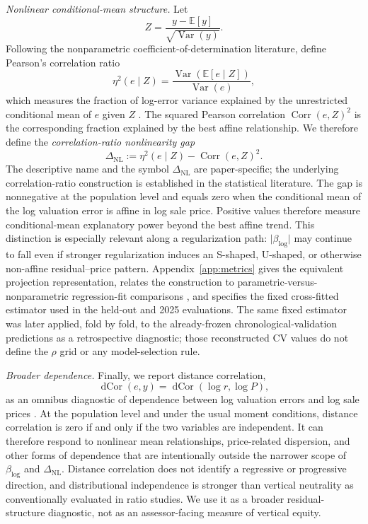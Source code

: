 \documentclass[10pt]{article}
\theoremstyle{definition}
\newcommand{\E}{\mathbb{E}}
\newcommand{\Corr}{\operatorname{Corr}}
\newcommand{\Var}{\operatorname{Var}}
\newcommand{\1}{\mathbf{1}}
\begin{document}
{\emph{Nonlinear conditional-mean structure.}
Let
\[
Z=\frac{y-\E[y]}{\sqrt{\Var(y)}}.
\]
Following the nonparametric coefficient-of-determination literature, define Pearson's
correlation ratio
\[
\eta^2(e\mid Z)
=
\frac{\Var\!\left(\E[e\mid Z]\right)}{\Var(e)},
\]
which measures the fraction of log-error variance explained by the unrestricted
conditional mean of $e$ given $Z$ \cite{DoksumSamarov1995}. The squared Pearson
correlation $\Corr(e,Z)^2$ is the corresponding fraction explained by the best
affine relationship. We therefore define the \emph{correlation-ratio nonlinearity
gap}
\begin{equation}
\label{eq:nonlinearity_gap}
\Delta_{\mathrm{NL}}
:=
\eta^2(e\mid Z)-\Corr(e,Z)^2.
\end{equation}
The descriptive name and the symbol $\Delta_{\mathrm{NL}}$ are paper-specific;
the underlying correlation-ratio construction is established in the statistical
literature. The gap is nonnegative at the population level and equals zero when the
conditional mean of the log valuation error is affine in log sale price. Positive
values therefore measure conditional-mean explanatory power beyond the best affine
trend. This distinction is especially relevant along a regularization path:
$\lvert\beta_{\log}\rvert$ may continue to fall even if stronger regularization
induces an S-shaped, U-shaped, or otherwise non-affine residual--price pattern.
Appendix~\ref{app:metrics} gives the equivalent projection representation, relates
the construction to parametric-versus-nonparametric regression-fit comparisons
\cite{HardleMammen1993}, and specifies the fixed cross-fitted estimator used in the
held-out and 2025 evaluations.
The same fixed estimator was later applied, fold by fold, to the already-frozen chronological-validation predictions as a retrospective diagnostic; those reconstructed CV values do not define the $\rho$ grid or any model-selection rule.

\emph{Broader dependence.}
Finally, we report distance correlation,
\begin{equation}
\label{eq:dcor_diagnostic}
\operatorname{dCor}(e,y)
=
\operatorname{dCor}(\log r,\log P),
\end{equation}
as an omnibus diagnostic of dependence between log valuation errors and log sale
prices \cite{SzekelyRizzoBakirov2007}. At the population level and under the usual
moment conditions, distance correlation is zero if and only if the two variables
are independent. It can therefore respond to nonlinear mean relationships,
price-related dispersion, and other forms of dependence that are intentionally
outside the narrower scope of $\beta_{\log}$ and $\Delta_{\mathrm{NL}}$. Distance
correlation does not identify a regressive or progressive direction, and
distributional independence is stronger than vertical neutrality as conventionally
evaluated in ratio studies. We use it as a broader residual-structure diagnostic,
not as an assessor-facing measure of vertical equity.
}
\end{document}
